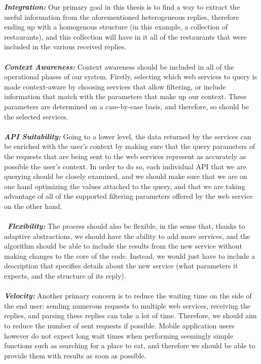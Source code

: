 \textbf{\textit{Integration:}} Our primary goal in this thesis is to find a way to extract the useful information from the aforementioned heterogeneous replies, therefore ending up with a homogenous structure (in this example, a collection of restaurants), and this collection will have in it all of the restaurants that were included in the various received replies.\\\\
\textbf{\textit{Context Awareness:}} Context awareness should be included in all of the operational phases of our system. Firstly, selecting which web services to query is made context-aware by choosing services that allow filtering, or include information that match with the parameters that make up our context. These parameters are determined on a case-by-case basis, and therefore, so should be the selected services.\\\\
\textbf{\textit{API Suitability:}} Going to a lower level, the data returned by the services can be enriched with the user's context by making sure that the query parameters of the requests that are being sent to the web services represent as accurately as possible the user's context. In order to do so, each individual API that we are querying should be closely examined, and we should make sure that we are on one hand optimizing the values attached to the query, and that we are taking advantage of all of the supported filtering parameters offered by the web service on the other hand.\\\\\
\textbf{\textit{Flexibility:}} The process should also be flexible, in the sense that, thanks to adaptive abstractions, we should have the ability to add more services, and the algorithm should be able to include the results from the new service without making changes to the core of the code. Instead, we would just have to include a description that specifies details about the new service (what parameters it expects, and the structure of its reply).\\\\
\textbf{\textit{Velocity:}} Another primary concern is to reduce the waiting time on the side of the end user: sending numerous requests to multiple web services, receiving the replies, and parsing these replies can take a lot of time. Therefore, we should aim to reduce the number of sent requests if possible. Mobile application users however do not expect long wait times when performing seemingly simple functions such as searching for a place to eat, and therefore we should be able to provide them with results as soon as possible.\\\\
